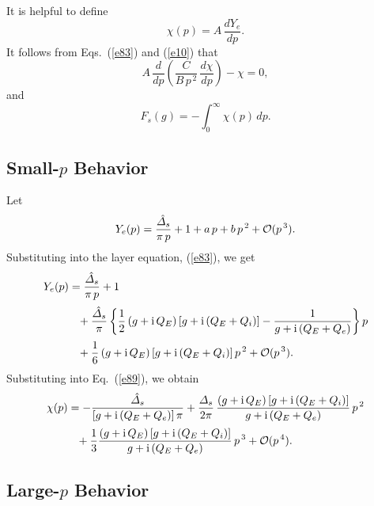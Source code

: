 \documentclass[titlepage=false,12pt]{article}
\begin{document}
It is helpful to define
\begin{equation}\label{e89}
\chi(p) = A\,\frac{dY_e}{dp}.
\end{equation}
It follows from Eqs.~(\ref{e83})  and (\ref{e10}) that
\begin{equation}\label{e90}
A\,\frac{d}{dp}\!\left(\frac{C}{B\,p^{\,2}}\,\frac{d\chi}{dp}\right) - \chi = 0,
\end{equation}
and
\begin{equation}
F_s(g)= -\int_0^\infty \chi(p)\,dp.
\end{equation}

\subsection{Small-$p$ Behavior}
Let
\begin{equation}
Y_e(p) = \frac{\hat{\mit\Delta}_s}{\pi\,p} + 1+ a\,p+b\,p^{\,2}+{\cal O}(p^{\,3}).
\end{equation}
Substituting into the layer  equation, (\ref{e83}), we get
\begin{align}
Y_e(p) &= \frac{\hat{\mit\Delta}_s}{\pi\,p} + 1
\nonumber\\[0.5ex]
&\phantom{=}+\frac{\hat{\mit\Delta}_s}{\pi}\left\{
\frac{1}{2}\,(g+{\rm i}\,Q_E)\,[g+{\rm i}\,(Q_E+Q_i)]-\frac{1}{g+{\rm i}\,(Q_E+Q_e)}\right\}p\nonumber\\[0.5ex]
&\phantom{=} + \frac{1}{6}\,(g+{\rm i}\,Q_E)\,[g+{\rm i}\,(Q_E+Q_i)]\,p^{\,2}+{\cal O}(p^{\,3}).
\end{align}
Substituting into Eq.~(\ref{e89}), we obtain
\begin{align}
\chi(p) &= -\frac{\hat{\mit\Delta}_s}{[g+{\rm i}\,(Q_E+Q_e)]\,\pi}+\frac{{\mit\Delta}_s}{2\pi}\,\frac{(g+{\rm i}\,Q_E)\,[g+{\rm i}\,(Q_E+Q_i)]}{g+{\rm i}\,(Q_E+Q_e)}\,p^{\,2}\nonumber\\[0.5ex]
&\phantom{=} + \frac{1}{3} \frac{(g+{\rm i}\,Q_E)\,[g+{\rm i}\,(Q_E+Q_i)]}{g+{\rm i}\,(Q_E+Q_e)}\,p^{\,3}+{\cal O}(p^{\,4}).
\end{align}

\subsection{Large-$p$ Behavior}
\end{document}
